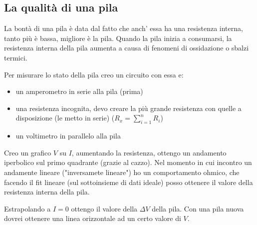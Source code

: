 \documentclass{article}
\begin{document}
\subsection{La qualità di una pila}
La bontà di una pila è data dal fatto che anch' essa ha una resistenza interna, tanto più è bassa, migliore è la pila.
Quando la pila inizia a consumarsi, la resistenza interna della pila aumenta a causa di fenomeni di ossidazione o sbalzi termici. 

Per misurare lo stato della pila creo un circuito con essa e:
\begin{itemize}
\item un amperometro in serie alla pila (prima)
\item una resistenza incognita, devo creare la più grande resistenza con quelle a disposizione (le metto in serie) ($R_x = \sum_{i=1}^{n} R_i$)
\item un voltimetro in parallelo alla pila
\end{itemize} 
\begin{center}
\end{center}
Creo un grafico $V$ su $I$, aumentando la resistenza, ottengo un andamento iperbolico sul primo quadrante (grazie al cazzo). 
Nel momento in cui incontro un andamente lineare ("inversamete lineare") ho un comportamento ohmico, che facendo il fit lineare (sul sottoinsieme di dati ideale) posso ottenere il valore della resistenza interna della pila. 

Estrapolando a $I=0$ ottengo il valore della $\Delta V$ della pila. Con una pila nuova dovrei ottenere una linea orizzontale ad un certo valore di $V$.
\end{document}
